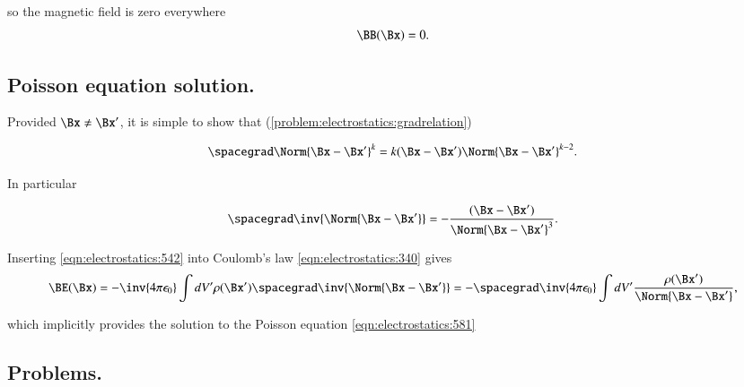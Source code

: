 so the magnetic field is zero everywhere
\begin{dmath}\label{eqn:electrostatics:320}
\BB(\Bx) = 0.
\end{dmath}


\subsection{Poisson equation solution.}

Provided \( \Bx \ne \Bx' \), it is simple to show that (\cref{problem:electrostatics:gradrelation})

\begin{dmath}\label{eqn:electrostatics:541}
\spacegrad \Norm{\Bx - \Bx'}^k = k (\Bx - \Bx') \Norm{ \Bx - \Bx' }^{k-2}.
\end{dmath}

In particular

\begin{dmath}\label{eqn:electrostatics:542}
\spacegrad \inv{\Norm{\Bx - \Bx'}} = - \frac{(\Bx - \Bx')}{\Norm{ \Bx - \Bx' }^{3}}.
\end{dmath}

Inserting \cref{eqn:electrostatics:542} into Coulomb's law \cref{eqn:electrostatics:340} gives
\begin{dmath}\label{eqn:electrostatics:661}
\BE(\Bx)
=
-\inv{4 \pi \epsilon_0} \int dV' \rho(\Bx') \spacegrad \inv{\Norm{\Bx - \Bx'}}
=
- \spacegrad \inv{4 \pi \epsilon_0} \int dV' \frac{\rho(\Bx')}{\Norm{\Bx - \Bx'}},
\end{dmath}

which implicitly provides the solution to the Poisson equation \cref{eqn:electrostatics:581}


\subsection{Problems.}


